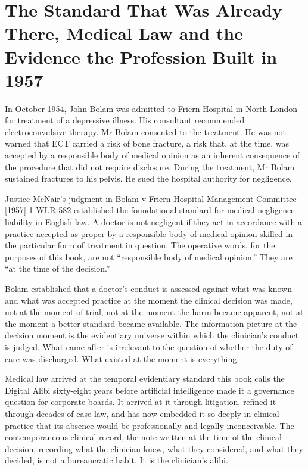 
\chapter{The Standard That Was Already There, Medical Law and the Evidence the Profession Built in 1957}

In October 1954, John Bolam was admitted to Friern Hospital in North London for treatment of a depressive illness. His consultant recommended electroconvulsive therapy. Mr Bolam consented to the treatment. He was not warned that ECT carried a risk of bone fracture, a risk that, at the time, was accepted by a responsible body of medical opinion as an inherent consequence of the procedure that did not require disclosure. During the treatment, Mr Bolam sustained fractures to his pelvis. He sued the hospital authority for negligence.

Justice McNair's judgment in Bolam v Friern Hospital Management Committee {[}1957{]} 1 WLR 582 established the foundational standard for medical negligence liability in English law. A doctor is not negligent if they act in accordance with a practice accepted as proper by a responsible body of medical opinion skilled in the particular form of treatment in question. The operative words, for the purposes of this book, are not ``responsible body of medical opinion.'' They are ``at the time of the decision.''

Bolam established that a doctor's conduct is assessed against what was known and what was accepted practice at the moment the clinical decision was made, not at the moment of trial, not at the moment the harm became apparent, not at the moment a better standard became available. The information picture at the decision moment is the evidentiary universe within which the clinician's conduct is judged. What came after is irrelevant to the question of whether the duty of care was discharged. What existed at the moment is everything.

Medical law arrived at the temporal evidentiary standard this book calls the Digital Alibi sixty-eight years before artificial intelligence made it a governance question for corporate boards. It arrived at it through litigation, refined it through decades of case law, and has now embedded it so deeply in clinical practice that its absence would be professionally and legally inconceivable. The contemporaneous clinical record, the note written at the time of the clinical decision, recording what the clinician knew, what they considered, and what they decided, is not a bureaucratic habit. It is the clinician's alibi.

